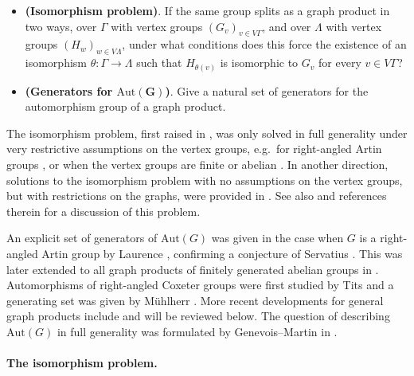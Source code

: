\documentclass[a4paper,english,11pt]{article}
\theoremstyle{definition}
\theoremstyle{remark}
\newcommand{\Aut}{\mathrm{Aut}}
\begin{document}
\medskip

\begin{itemize}
\item \textbf{(Isomorphism problem)}. If the same group splits as a graph product in two ways, over $\Gamma$ with vertex groups $(G_v)_{v\in V\Gamma}$, and over $\Lambda$ with vertex groups $(H_w)_{w\in V\Lambda}$, under what conditions does this force the existence of an isomorphism $\theta:\Gamma\to\Lambda$ such that $H_{\theta(v)}$ is isomorphic to $G_v$ for every $v\in V\Gamma$?
\item \textbf{(Generators for $\boldsymbol{\Aut(G)}$)}. Give a natural set of generators for the automorphism group of a graph product.
\end{itemize}

\medskip

The isomorphism problem, first raised in \cite[Chapter~4]{Gre}, was only solved in full generality under very restrictive assumptions on the vertex groups, e.g.\ for right-angled Artin groups \cite{Dro}, or when the vertex groups are finite \cite{Gre,Rad} or abelian \cite{GP}. In another direction, solutions to the isomorphism problem with no assumptions on the vertex groups, but with restrictions on the graphs, were provided in \cite{Gen,EH}. {See also \cite[Section~5.5]{Ber} and references therein for a discussion of this problem.}

An explicit set of generators of $\Aut(G)$ was given in the case when $G$ is a right-angled Artin group by Laurence \cite{Lau}, confirming a conjecture of Servatius \cite{Ser}. This was later extended to all graph products of {finitely generated} abelian groups in \cite{CG}. Automorphisms of right-angled Coxeter groups were first studied by Tits \cite{TitsRACG} and a generating set was given by Mühlherr \cite{Muhlherr}. More recent developments for general graph products include \cite{GM,Gen} and will be reviewed below. The question of describing $\Aut(G)$ in full generality was formulated by Genevois--Martin in \cite[]{GM}.

\paragraph*{The isomorphism problem.}
\end{document}
